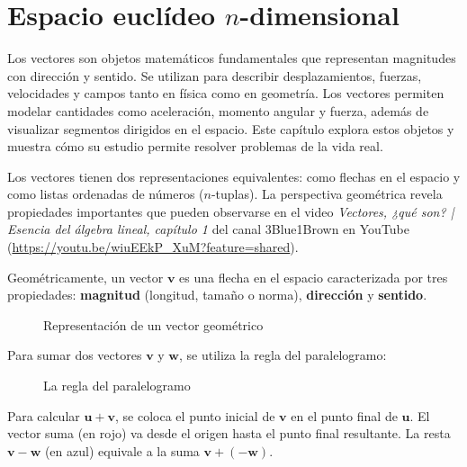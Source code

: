 \chapter{Espacio euclídeo $n$-dimensional} \label{vegern}

Los vectores son objetos matemáticos fundamentales que representan magnitudes con dirección y sentido. Se utilizan para describir desplazamientos, fuerzas, velocidades y campos tanto en física como en geometría. Los vectores permiten modelar cantidades como aceleración, momento angular y fuerza, además de visualizar segmentos dirigidos en el espacio. Este capítulo explora estos objetos y muestra cómo su estudio permite resolver problemas de la vida real.

Los vectores tienen dos representaciones equivalentes: como flechas en el espacio y como listas ordenadas de números ($n$-tuplas). La perspectiva geométrica revela propiedades importantes que pueden observarse en el video \textit{Vectores, ¿qué son? | Esencia del álgebra lineal, capítulo 1} del canal 3Blue1Brown en YouTube (\url{https://youtu.be/wiuEEkP_XuM?feature=shared}).

\begin{definition}\label{defvectoresgeometrica}
 
Geométricamente, un vector $\mathbf{v}$ es una flecha en el espacio caracterizada por tres propiedades: \textbf{magnitud} (longitud, tamaño o norma), \textbf{dirección} y \textbf{sentido}.

\begin{figure}[H]
\centering
{}
\caption{Representación de un vector geométrico}
\end{figure}

Para sumar dos vectores $\mathbf{v}$ y $\mathbf{w}$, se utiliza la regla del paralelogramo:
 
\begin{figure}[H]
\centering
{}
\caption{La regla del paralelogramo}
\end{figure}

Para calcular $\mathbf{u}+\mathbf{v}$, se coloca el punto inicial de $\mathbf{v}$ en el punto final de $\mathbf{u}$. El vector suma (en rojo) va desde el origen hasta el punto final resultante. La resta $\mathbf{v}-\mathbf{w}$ (en azul) equivale a la suma $\mathbf{v}+(-\mathbf{w})$.
\end{definition}

